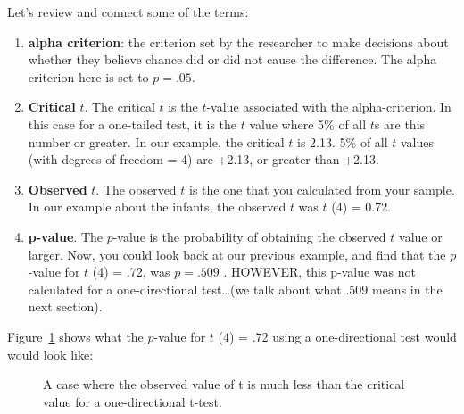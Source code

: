 \documentclass[
  letterpaper,
  DIV=11,
  numbers=noendperiod]{scrreprt}
\begin{document}
Let's review and connect some of the terms:

\begin{enumerate}
\def\labelenumi{\arabic{enumi}.}
\item
  \textbf{alpha criterion}: the criterion set by the researcher to make
  decisions about whether they believe chance did or did not cause the
  difference. The alpha criterion here is set to \(p = .05\).
\item
  \textbf{Critical} \(t\). The critical \(t\) is the \(t\)-value
  associated with the alpha-criterion. In this case for a one-tailed
  test, it is the \(t\) value where 5\% of all \(t\)s are this number or
  greater. In our example, the critical \(t\) is 2.13. 5\% of all \(t\)
  values (with degrees of freedom = 4) are +2.13, or greater than +2.13.
\item
  \textbf{Observed} \(t\). The observed \(t\) is the one that you
  calculated from your sample. In our example about the infants, the
  observed \(t\) was \(t\) (4) = 0.72.
\item
  \textbf{p-value}. The \(p\)-value is the probability of obtaining the
  observed \(t\) value or larger. Now, you could look back at our
  previous example, and find that the \(p\)-value for \(t\) (4) = .72,
  was \(p = .509\) . HOWEVER, this p-value was not calculated for a
  one-directional test\ldots(we talk about what .509 means in the next
  section).
\end{enumerate}

Figure~\ref{fig-7tonedirection} shows what the \(p\)-value for \(t\) (4)
= .72 using a one-directional test would would look like:

\begin{figure}


\caption{\label{fig-7tonedirection}A case where the observed value of t
is much less than the critical value for a one-directional t-test.}

\end{figure}%
\end{document}
